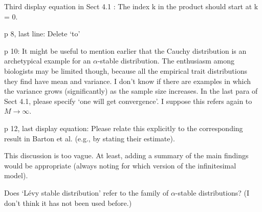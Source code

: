 \reply{
}

\begin{point}{}
Third display equation in Sect 4.1 \revref: The index k in the product should start at k = 0.
\end{point}

\reply{
}

\begin{point}{}
p 8, last line: Delete ‘to’
\end{point}

\reply{
}

\begin{point}{}
p 10: It might be useful to mention earlier that the Cauchy distribution is an archetypical
example for an $\alpha$-stable distribution. The enthusiasm among biologists may be limited
though, because all the empirical trait distributions they find have mean and variance. I
don’t know if there are examples in which the variance grows (significantly) as the sample
size increases. In the last para of Sect 4.1, please specify ‘one will get convergence’. I
suppose this refers again to $M \to \infty$.
\end{point}

\reply{
}

\begin{point}{}
p 12, last display equation: Please relate this explicitly to the corresponding result in
Barton et al. (e.g., by stating their estimate).
\end{point}

\reply{
}

\begin{point}{\revref}
This discussion is too vague. At least, adding a summary of the main findings
would be appropriate (always noting for which version of the infinitesimal model).
\end{point}


\begin{point}{\revref}
Does ‘Lévy stable distribution’ refer to the family of $\alpha$-stable
distributions? (I don’t think it has not been used before.)
\end{point}

